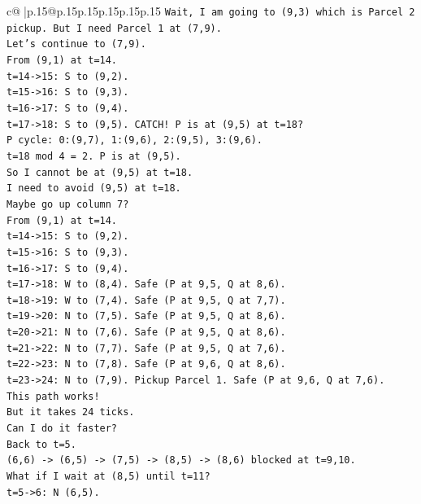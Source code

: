 \documentclass{article}
\begin{document}
{\begin{supertabular}{c@{$\;$}|p{.15\linewidth}@{}p{.15\linewidth}p{.15\linewidth}p{.15\linewidth}p{.15\linewidth}p{.15\linewidth}}
{{{\texttt{Wait, I am going to (9,3) which is Parcel 2 pickup. But I need Parcel 1 at (7,9).} \\
\texttt{Let's continue to (7,9).} \\
\texttt{From (9,1) at t=14.} \\
\texttt{t=14{-}>15: S to (9,2).} \\
\texttt{t=15{-}>16: S to (9,3).} \\
\texttt{t=16{-}>17: S to (9,4).} \\
\texttt{t=17{-}>18: S to (9,5). CATCH! P is at (9,5) at t=18?} \\
\texttt{P cycle: 0:(9,7), 1:(9,6), 2:(9,5), 3:(9,6).} \\
\texttt{t=18 mod 4 = 2. P is at (9,5).} \\
\texttt{So I cannot be at (9,5) at t=18.} \\
\texttt{I need to avoid (9,5) at t=18.} \\
\texttt{Maybe go up column 7?} \\
\texttt{From (9,1) at t=14.} \\
\texttt{t=14{-}>15: S to (9,2).} \\
\texttt{t=15{-}>16: S to (9,3).} \\
\texttt{t=16{-}>17: S to (9,4).} \\
\texttt{t=17{-}>18: W to (8,4). Safe (P at 9,5, Q at 8,6).} \\
\texttt{t=18{-}>19: W to (7,4). Safe (P at 9,5, Q at 7,7).} \\
\texttt{t=19{-}>20: N to (7,5). Safe (P at 9,5, Q at 8,6).} \\
\texttt{t=20{-}>21: N to (7,6). Safe (P at 9,5, Q at 8,6).} \\
\texttt{t=21{-}>22: N to (7,7). Safe (P at 9,5, Q at 7,6).} \\
\texttt{t=22{-}>23: N to (7,8). Safe (P at 9,6, Q at 8,6).} \\
\texttt{t=23{-}>24: N to (7,9). Pickup Parcel 1. Safe (P at 9,6, Q at 7,6).} \\
\texttt{This path works!} \\
\texttt{But it takes 24 ticks.} \\
\texttt{Can I do it faster?} \\
\texttt{Back to t=5.} \\
\texttt{(6,6) {-}> (6,5) {-}> (7,5) {-}> (8,5) {-}> (8,6) blocked at t=9,10.} \\
\texttt{What if I wait at (8,5) until t=11?} \\
\texttt{t=5{-}>6: N (6,5).} \\
}}}
\end{supertabular}}
\end{document}
